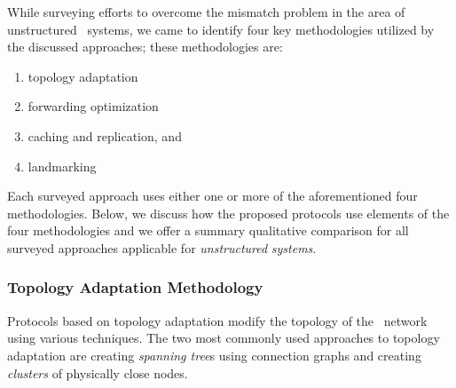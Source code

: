 While surveying efforts to overcome the mismatch problem
in the area of unstructured \p\ systems,
we came to identify four key methodologies 
utilized by the discussed approaches; these methodologies are:
\begin{enumerate}
  \item topology adaptation
  \item forwarding optimization
  \item caching and replication, and
  \item landmarking
\end{enumerate}
Each surveyed approach uses either one or more of the
aforementioned four methodologies. 
Below, we discuss how the proposed protocols use 
elements of the four methodologies and we offer 
a summary qualitative comparison for all surveyed approaches 
applicable for \emph{unstructured} \p \emph{systems}.


\subsubsection{Topology Adaptation Methodology}

Protocols based on topology adaptation 
modify the topology of the \p\ network
using various techniques. 
The two most commonly used approaches to 
topology adaptation are creating
\emph{spanning tree}s using connection graphs 
and creating \emph{clusters} of physically close nodes.

